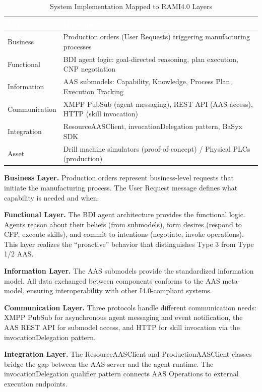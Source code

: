 \begin{table}[ht]
\centering
\caption{System Implementation Mapped to RAMI4.0 Layers}
\label{tab:rami_layers}
\begin{tabular}{p{}p{}}
\toprule
\rowcolor{headerblue}
\textcolor{white}{Layer} & \textcolor{white}{Implementation} \\
\midrule
Business & Production orders (User Requests) triggering manufacturing processes \\
\rowcolor{lightgray}
Functional & BDI agent logic: goal-directed reasoning, plan execution, CNP negotiation \\
Information & AAS submodels: Capability, Knowledge, Process Plan, Execution Tracking \\
\rowcolor{lightgray}
Communication & XMPP PubSub (agent messaging), REST API (AAS access), HTTP (skill invocation) \\
Integration & ResourceAASClient, invocationDelegation pattern, BaSyx SDK \\
\rowcolor{lightgray}
Asset & Drill machine simulators (proof-of-concept) / Physical PLCs (production) \\
\bottomrule
\end{tabular}
\end{table}

\textbf{Business Layer.} Production orders represent business-level requests that initiate the manufacturing process. The User Request message defines what capability is needed and when.

\textbf{Functional Layer.} The \ac{BDI} agent architecture provides the functional logic. Agents reason about their beliefs (from submodels), form desires (respond to CFP, execute skills), and commit to intentions (negotiate, invoke operations). This layer realizes the ``proactive'' behavior that distinguishes Type 3 from Type 1/2 \ac{AAS}.

\textbf{Information Layer.} The \ac{AAS} submodels provide the standardized information model. All data exchanged between components conforms to the \ac{AAS} meta-model, ensuring interoperability with other I4.0-compliant systems.

\textbf{Communication Layer.} Three protocols handle different communication needs: XMPP PubSub for asynchronous agent messaging and event notification, the \ac{AAS} REST API for submodel access, and HTTP for skill invocation via the invocationDelegation pattern.

\textbf{Integration Layer.} The ResourceAASClient and ProductionAASClient classes bridge the gap between the \ac{AAS} server and the agent runtime. The invocationDelegation qualifier pattern connects \ac{AAS} Operations to external execution endpoints.

